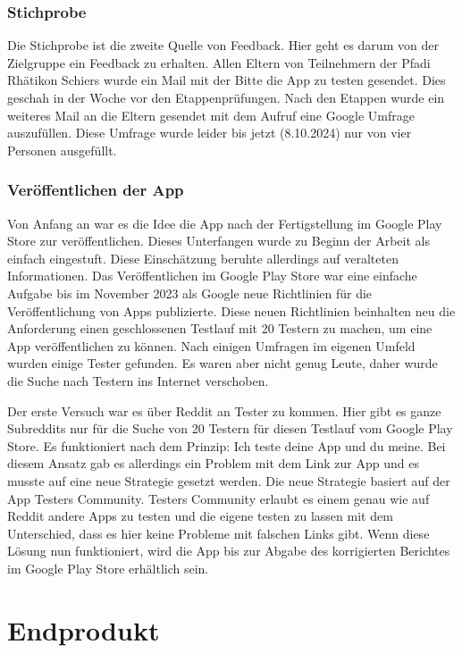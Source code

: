 \subsubsection{Stichprobe}

Die Stichprobe ist die zweite Quelle von Feedback. Hier geht es darum von der Zielgruppe ein Feedback zu erhalten. Allen Eltern von Teilnehmern der Pfadi Rhätikon Schiers wurde ein Mail mit der Bitte die App zu testen gesendet. Dies geschah in der Woche vor den Etappenprüfungen. Nach den Etappen wurde ein weiteres Mail an die Eltern gesendet mit dem Aufruf eine Google Umfrage auszufüllen. Diese Umfrage wurde leider bis jetzt (8.10.2024) nur von vier Personen ausgefüllt.

\subsubsection{Veröffentlichen der App}

Von Anfang an war es die Idee die App nach der Fertigstellung im Google Play Store zur veröffentlichen. Dieses Unterfangen wurde zu Beginn der Arbeit als einfach eingestuft. Diese Einschätzung beruhte allerdings auf veralteten Informationen. Das Veröffentlichen im Google Play Store war eine einfache Aufgabe bis im November 2023 als Google neue Richtlinien für die Veröffentlichung von Apps publizierte. Diese neuen Richtlinien beinhalten neu die Anforderung einen geschlossenen Testlauf mit 20 Testern zu machen, um eine App veröffentlichen zu können. Nach einigen Umfragen im eigenen Umfeld wurden einige Tester gefunden. Es waren aber nicht genug Leute, daher wurde die Suche nach Testern ins Internet verschoben. \par
Der erste Versuch war es über Reddit an Tester zu kommen. Hier gibt es ganze Subreddits nur für die Suche von 20 Testern für diesen Testlauf vom Google Play Store. Es funktioniert nach dem Prinzip: Ich teste deine App und du meine. Bei diesem Ansatz gab es allerdings ein Problem mit dem Link zur App und es musste auf eine neue Strategie gesetzt werden. Die neue Strategie basiert auf der App Testers Community. Testers Community erlaubt es einem genau wie auf Reddit andere Apps zu testen und die eigene testen zu lassen mit dem Unterschied, dass es hier keine Probleme mit falschen Links gibt. Wenn diese Lösung nun funktioniert, wird die App bis zur Abgabe des korrigierten Berichtes im Google Play Store erhältlich sein.

\newpage

\section{Endprodukt}

